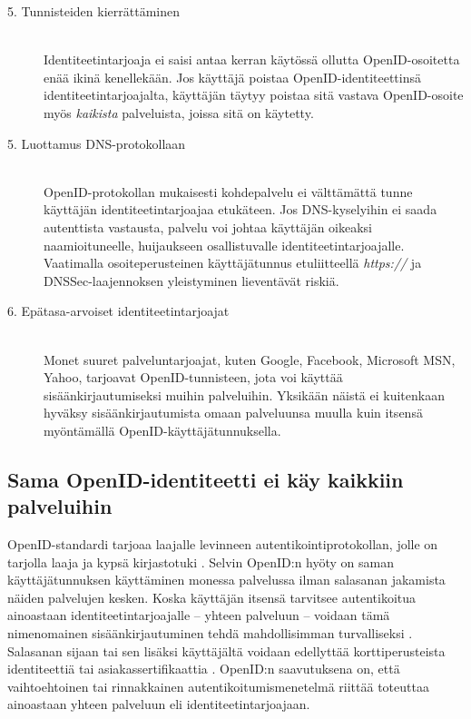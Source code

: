 \documentclass[english,gradu]{tktltiki}
\begin{document}
\begin{description}
  \item[5. Tunnisteiden kierrättäminen] \hfill \\
    Identiteetintarjoaja ei saisi antaa kerran käytössä ollutta OpenID-osoitetta enää ikinä kenellekään.
    Jos käyttäjä poistaa OpenID-identiteettinsä identiteetintarjoajalta, käyttäjän täytyy poistaa sitä vastava
    OpenID-osoite
    myös \emph{kaikista} palveluista, joissa sitä on käytetty.

  \item[5. Luottamus DNS-protokollaan] \hfill \\
    OpenID-protokollan mukaisesti kohdepalvelu ei välttämättä tunne käyttäjän identiteetintarjoajaa etukäteen.
    Jos DNS-kyselyihin ei saada autenttista vastausta, palvelu voi johtaa käyttäjän oikeaksi naamioituneelle,
    huijaukseen osallistuvalle identiteetintarjoajalle. Vaatimalla osoiteperusteinen käyttäjätunnus
    etuliitteellä \emph{https://} ja DNSSec-laajennoksen yleistyminen lieventävät riskiä.

   \item[6. Epätasa-arvoiset identiteetintarjoajat] \hfill \\
      Monet suuret palveluntarjoajat, kuten Google, Facebook, Microsoft MSN, Yahoo, tarjoavat OpenID-tunnisteen,
      jota voi käyttää sisäänkirjautumiseksi muihin palveluihin. Yksikään näistä ei kuitenkaan hyväksy
      sisäänkirjautumista omaan palveluunsa muulla kuin itsensä myöntämällä OpenID-käyttäjätunnuksella.

\end{description}


\subsection{Sama OpenID-identiteetti ei käy kaikkiin palveluihin}

OpenID-standardi tarjoaa laajalle levinneen autentikointiprotokollan, jolle on tarjolla laaja ja kypsä kirjastotuki \cite{openid_libraries}. Selvin OpenID:n hyöty on saman käyttäjätunnuksen käyttäminen monessa palvelussa ilman salasanan jakamista näiden palvelujen kesken. Koska käyttäjän itsensä tarvitsee autentikoitua ainoastaan identiteetintarjoajalle -- yhteen palveluun -- voidaan tämä nimenomainen sisäänkirjautuminen tehdä mahdollisimman turvalliseksi \cite{blackhat_openid_security_story}. Salasanan sijaan tai sen lisäksi käyttäjältä voidaan edellyttää korttiperusteista identiteettiä \cite{cameron_infocard_07} tai asiakassertifikaattia \cite{henry_story_foaf_ssl}. OpenID:n saavutuksena on, että vaihtoehtoinen tai rinnakkainen autentikoitumismenetelmä riittää toteuttaa ainoastaan yhteen palveluun eli identiteetintarjoajaan.
\end{document}
